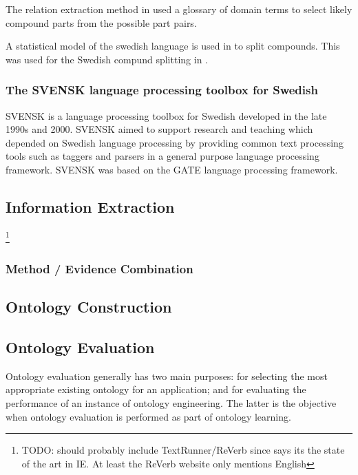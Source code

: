 \documentclass[a4paper]{report}
\newcommand{\todo}[1]{\footnote{{\color{red} TODO: #1}}}
\begin{document}
The relation extraction method in \cite{Kokkinakis08SolidComp} used a glossary of domain terms to select likely compound parts from the possible part pairs.

A statistical model of the swedish language is used in \citep{Sjobergh04Compounds} to split compounds. This was used for the Swedish compund splitting in \citep{Hjelm09Thesis}.

\subsubsection{The SVENSK language processing toolbox for Swedish}

SVENSK is a language processing toolbox for Swedish developed in the late 1990s and 2000\cite{OlssonGamback00SVENSK}. SVENSK aimed to support research and teaching which depended on Swedish language processing by providing common text processing tools such as taggers and parsers in a general purpose language processing framework. SVENSK was based on the GATE language processing framework.

\subsection{Information Extraction}

\todo{should probably include TextRunner/ReVerb since \cite{Poon2010OntoUSP} says its the state of the art in IE. At least the ReVerb website only mentions English}

\subsubsection{Method / Evidence Combination}

\subsection{Ontology Construction}

\subsection{Ontology Evaluation}

Ontology evaluation generally has two main purposes: for selecting the most appropriate existing ontology for an application; and for evaluating the performance of an instance of ontology engineering.
The latter is the objective when ontology evaluation is performed as part of ontology learning.
\end{document}
